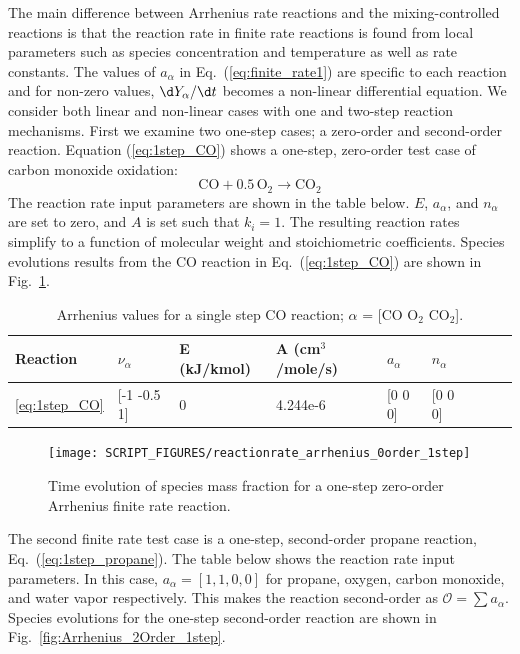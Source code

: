 \documentclass[11pt]{book}
\begin{document}
The main difference between Arrhenius rate reactions and the mixing-controlled reactions is that the reaction rate in finite rate reactions is found from local parameters such as species concentration and temperature as well as rate constants. The values of $a_{\alpha}$ in Eq.~(\ref{eq:finite_rate1}) are specific to each reaction and for non-zero values, $\d Y_{\alpha}/ \d t$ becomes  a non-linear differential equation. We consider both linear and non-linear cases with one and two-step reaction mechanisms. First we examine two one-step cases; a zero-order and second-order reaction. Equation (\ref{eq:1step_CO}) shows a one-step, zero-order test case of carbon monoxide oxidation:
\begin{equation}\label{eq:1step_CO}
\mathrm{CO+0.5 \, O_2 \rightarrow  CO_2}
\end{equation}
The reaction rate input parameters are shown in the table below. $E$, $a_{\alpha}$, and $n_{\alpha}$ are set to zero, and $A$ is set such that ${k}_{i} = 1$. The resulting reaction rates simplify to a function of molecular weight and stoichiometric coefficients. Species evolutions results from the CO reaction in Eq.~(\ref{eq:1step_CO}) are shown in Fig.~\ref{fig:Arrhenius_0Order_1step}.
\begin{table}[ht]
\begin{center}
\caption[Arrhenius values for a single step CO reaction]{Arrhenius values for a single step CO reaction; $\alpha$ = [$\mathrm{CO}$ $\mathrm{O_2}$ $\mathrm{CO_2}$].}
\label{single_step_co}
\begin{tabular}{|l|l|l|l|l|l|l|l|l|}
\hline Reaction & $\nu_{\alpha}$ & E (kJ/kmol) & A (cm$^3$/mole/s) & $a_{\alpha}$ & $n_{\alpha}$  \\ \hline \hline
\ref{eq:1step_CO} & [-1 -0.5 1] & 0 & 4.244e-6 & [0 0 0] & [0 0 0] \\ \hline
\end{tabular}
\end{center}
\end{table}
\begin{figure}[h!]
\centering
\texttt{[image: SCRIPT\_FIGURES/reactionrate\_arrhenius\_0order\_1step]}
\caption[Species evolution in a 0-order 1-step finite rate reaction]{Time evolution of species mass fraction for a one-step zero-order Arrhenius finite rate reaction.}
\label{fig:Arrhenius_0Order_1step}
\end{figure}
The second finite rate test case is a one-step, second-order propane reaction, Eq.~(\ref{eq:1step_propane}). The table below shows the reaction rate input parameters. In this case, $a_{\alpha}=[1,1,0,0]$  for propane, oxygen, carbon monoxide, and water vapor respectively. This makes the reaction second-order as $\mathcal{O}=\sum a_{\alpha}$. Species evolutions for the one-step second-order reaction are shown in Fig.~\ref{fig:Arrhenius_2Order_1step}.
\end{document}
